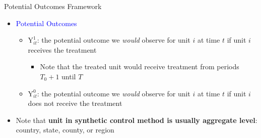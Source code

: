 \documentclass[dvipsnames,hyperref={pdfpagelabels=false}]{beamer}
\begin{document}
\begin{frame}{Potential Outcomes Framework}{}
\begin{itemize}
\item \textcolor{blue}{Potential Outcomes}
\vspace{0.2cm}
\begin{itemize}
\item $\mathrm{Y}^{1}_{it}$: the potential outcome we \textit{would} observe for unit $i$ at time $t$ if unit $i$ receives the treatment 
\vspace{0.2cm}
\begin{itemize}
\item Note that the treated unit would receive treatment from periods $T_0+1$ until $T$
\end{itemize}
\vspace{0.2cm}
\item $\mathrm{Y}^{0}_{it}$: the potential outcome we \textit{would} observe for unit $i$ at time $t$ if unit $i$ does not receive the treatment
\end{itemize}
\vspace{0.2cm}
\item Note that \textbf{unit in synthetic control method is usually aggregate level}: country, state, county, or region 



\end{itemize}
\end{frame}
\end{document}
